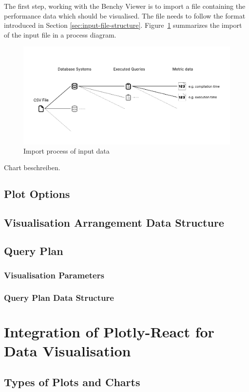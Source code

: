 The first step, working with the Benchy Viewer is to import a file containing the performance data which should be visualised. The file needs to follow the format introduced in Section \ref{sec:input-file-structure}. Figure~\ref{fig:input-process-flow} summarizes the import of the input file in a process diagram.

\begin{figure}[h]
  \centering
  \includegraphics[width=1\linewidth]{figures/csv-structure.pdf}
  \caption{Import process of input data}
  \label{fig:input-process-flow}
\end{figure}

Chart beschreiben.


\subsection{Plot Options}
\subsection{Visualisation Arrangement Data Structure}
\subsection{Query Plan}
\subsubsection{Visualisation Parameters}
\subsubsection{Query Plan Data Structure}

\section{Integration of Plotly-React for Data Visualisation}
\subsection{Types of Plots and Charts}
